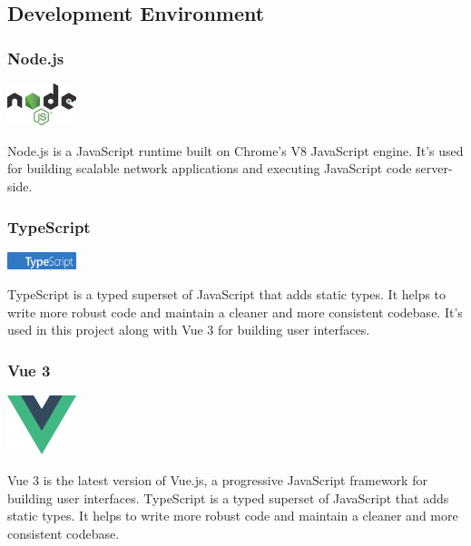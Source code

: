 \subsection{Development Environment}

\subsubsection*{Node.js}

\begin{center}
\includegraphics[width=0.15\textwidth]{Images/logos/node.png}
\label{fig:nodejs}
\end{center}
Node.js is a JavaScript runtime built on Chrome’s V8 JavaScript engine. It’s used for building scalable network applications and executing JavaScript code server-side.

\subsubsection*{TypeScript}

\begin{center}
\includegraphics[width=0.15\textwidth]{Images/logos/ts-lettermark-blue.png}
\label{fig:typescript}
\end{center}
TypeScript is a typed superset of JavaScript that adds static types. It helps to write more robust code and maintain a cleaner and more consistent codebase. It’s used in this project along with Vue 3 for building user interfaces.

\subsubsection*{Vue 3}

\begin{center}
\includegraphics[width=0.15\textwidth]{Images/logos/vue.png}
\label{fig:vue3}
\end{center}
Vue 3 is the latest version of Vue.js, a progressive JavaScript framework for building user interfaces. TypeScript is a typed superset of JavaScript that adds static types. It helps to write more robust code and maintain a cleaner and more consistent codebase.

